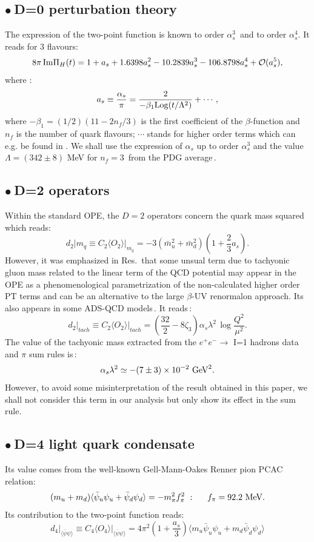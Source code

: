 \documentclass[review]{elsarticle}
\def\beq{\begin{equation}}
\def\eeq{\end{equation}}
\def\ga{\left(}
\def\dr{\right)}
\def\la{\langle}
\def\ra{\rangle}
\def\b{$\bullet~$}
\begin{document}
\subsection*{\b D=0 perturbation theory}
The expression of the two-point function is known to order $\alpha_s^3$\,\cite{LARIN} and to order $\alpha_s^4$\cite{CHET4}. It reads for 3 flavours:
\beq
8{\pi}\,{\rm Im}\Pi_H(t)=  1+a_s+1.6398a_s^2-10.2839a_s^3-106.8798a_s^4+{\cal O}(a_s^5),
\label{eq:pt}
\eeq
where : 
\beq
a_s\equiv \frac{\alpha_s}{\pi}=\frac{2}{-\beta_1{\rm Log} (t/\Lambda^2)}+\cdots,
\eeq 
where $-\beta_1=(1/2)(11-2n_f/3)$ is the first coefficient of the $\beta$-function and $n_f$ is the number of quark flavours;  $\cdots$ stands for higher order terms which can e.g. be found in \cite{SNB2}. We shall use the expression of $\alpha_s$ up to order $\alpha_s^3$ and the value $\Lambda =(342\pm 8)$ MeV  for  $n_f=3$\:\, from the PDG average\,\cite{PDG}.
\subsection*{\b D=2  operators}
Within the standard OPE, the $D=2$ operators concern the quark mass squared which reads:
\beq
d_2\vert{m_q}\equiv C_2\la O_2\ra\vert_{m_q} = -3(\bar m_u^2+\bar m_d^2)\ga 1+\frac{2}{3}a_s\dr.
\eeq
However, it was emphasized in Res.\,\cite{CNZa,SZ,CNZb,D2rev} that some unsual term due to tachyonic gluon mass related to the linear term of the QCD potential may appear in the OPE as a phenomenological parametrization of the non-calculated higher order PT terms and can be an alternative to the large $\beta$-UV renormalon approach. Its  also appears in some ADS-QCD models\,\cite{ADS1,ADS3}. It reads\,\cite{CNZa}:
\beq
d_2\vert_{tach}\equiv C_2\la O_2\ra\vert_{tach} = \ga \frac{32}{2}-8\zeta_3\dr \alpha_s\lambda^2\,\log\frac{Q^2}{\mu^2}. 
\eeq
The value of the tachyonic mass extracted from the $e^+e^-\to$ I=1 hadrons data  and $\pi$ sum rules is\,\cite{SN93,SN95,SNTAU,TERAYEV}:
\beq
\alpha_s\lambda^2\simeq -(7\pm 3)\times 10^{-2}~{\rm GeV}^2.
\eeq
However, to avoid some misinterpretation of the result obtained in this paper, we shall not consider this term in our analysis
but only show its effect in the sum rule. 
\subsection*{\b D=4  light quark condensate}
Its value comes from the well-known Gell-Mann-Oakes Renner pion PCAC relation:
\beq
 (m_u+m_d)\la\bar \psi_u\psi_u+\bar \psi_d\psi_d\ra =-m_\pi^2f_\pi^2\,\, :\,\,\,\,\,\,\,\,\, f_\pi=92.2~{\rm MeV}.
\eeq
Its contribution to the two-point function reads:
\beq
d_4\vert_{\la\bar\psi\psi\ra}\equiv C_4\la O_4\ra\vert_{\la\bar\psi\psi\ra}=4\pi^2\ga 1+\frac{a_s}{3}\dr\la m_u\bar \psi_u\psi_u+m_d\bar \psi_d\psi_d\ra
\eeq
\end{document}
